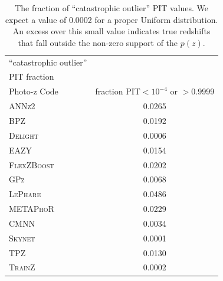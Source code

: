 \begin{table}
\setlength{\tabcolsep}{2pt}
\centering
\caption{The fraction of ``catastrophic outlier'' PIT values.  We expect a value of 0.0002 for a proper Uniform distribution.  An excess over this small value indicates true redshifts that fall outside the non-zero support of the $p(z)$.  }\label{tab:pitoutlier}
\begin{tabular}{lc}
\hline
\hline
 ``catastrophic outlier''\\ PIT fraction\\
\hline
Photo-z Code & fraction PIT$<10^{-4}$ or $>$0.9999\\
\hline
\textsc{ANNz2} & 0.0265\\
\textsc{BPZ} & 0.0192\\
\textsc{Delight} & 0.0006\\
\textsc{EAZY} & 0.0154\\
\textsc{FlexZBoost} & 0.0202\\
\textsc{GPz} & 0.0068\\
\textsc{LePhare} & 0.0486\\
\textsc{METAPhoR}& 0.0229\\
\textsc{CMNN} & 0.0034\\
\textsc{Skynet} & 0.0001\\
\textsc{TPZ} & 0.0130\\
\hline
\textsc{TrainZ} & 0.0002\\
\end{tabular}
\end{table}


